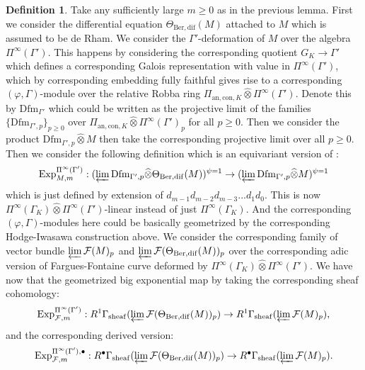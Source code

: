 \documentclass[12pt]{amsart}
\theoremstyle{definition}
\newtheorem{definition}[theorem]{Definition}
\numberwithin{equation}{section}
\begin{document}
\begin{definition}
Take any sufficiently large $m\geq 0$ as in the previous lemma. First we consider the differential equation $\Theta_{\mathrm{Ber,dif}}(M)$ attached to $M$ which is assumed to be de Rham. We consider the $\Gamma'$-deformation of $M$ over the algebra $\Pi^\infty(\Gamma')$. This happens by considering the corresponding quotient $G_K\rightarrow \Gamma'$	which defines a corresponding Galois representation with value in $\Pi^\infty(\Gamma')$, which by corresponding embedding fully faithful gives rise to a corresponding $(\varphi,\Gamma)$-module over the relative Robba ring $\Pi_{\mathrm{an,con},K}\widehat{\otimes}\Pi^\infty(\Gamma')$. Denote this by $\mathrm{Dfm}_{\Gamma'}$ which could be written as the projective limit of the families $\{\mathrm{Dfm}_{\Gamma',p}\}_{p\geq 0}$ over $\Pi_{\mathrm{an,con},K}\widehat{\otimes}\Pi^\infty(\Gamma')_p$ for all $p\geq 0$. Then we consider the product $\mathrm{Dfm}_{\Gamma',p}\widehat{\otimes} M$ then take the corresponding projective limit over all $p\geq 0$. Then we consider the following definition which is an equivariant version of \cite[Definition 3.7]{Nakamura1}:
\begin{displaymath}
\mathrm{Exp}^{\Pi^\infty(\Gamma')}_{M,m}: (\varprojlim \mathrm{Dfm}_{\Gamma',p}\widehat{\otimes} \Theta_{\mathrm{Ber,dif}}(M)	)^{\psi=1}\rightarrow (\varprojlim \mathrm{Dfm}_{\Gamma',p}\widehat{\otimes} M	)^{\psi=1}
\end{displaymath}
which is just defined by extension of $d_{m-1}d_{m-2}d_{m-3}...d_1d_0$. This is now $\Pi^\infty(\Gamma_K)\widehat{\otimes}\Pi^\infty(\Gamma')$-linear instead of just $\Pi^\infty(\Gamma_K)$. And the corresponding $(\varphi,\Gamma)$-modules here could be basically geometrized by the corresponding Hodge-Iwasawa construction above. We consider the corresponding family of vector bundle $\varprojlim\mathcal{F}(M)_p$ and $\varprojlim\mathcal{F}(\Theta_{\mathrm{Ber,dif}}(M))_p$ over the corresponding adic version of Fargues-Fontaine curve deformed by $\Pi^\infty(\Gamma_K)\widehat{\otimes}\Pi^\infty(\Gamma')$. We have now that the geometrized big exponential map by taking the corresponding sheaf cohomology:
\begin{displaymath}
\mathrm{Exp}^{\Pi^\infty(\Gamma')}_{\mathcal{F},m}: R^1\Gamma_\mathrm{sheaf}(\varprojlim\mathcal{F}(\Theta_{\mathrm{Ber,dif}}(M))_p) \rightarrow R^1\Gamma_\mathrm{sheaf}(\varprojlim\mathcal{F}(M)_p),
\end{displaymath}
and the corresponding derived version:
\begin{displaymath}
\mathrm{Exp}^{\Pi^\infty(\Gamma'),\bullet}_{\mathcal{F},m}: R^\bullet\Gamma_\mathrm{sheaf}(\varprojlim\mathcal{F}(\Theta_{\mathrm{Ber,dif}}(M))_p) \rightarrow R^\bullet\Gamma_\mathrm{sheaf}(\varprojlim\mathcal{F}(M)_p).
\end{displaymath}\\
\end{definition}
\end{document}
